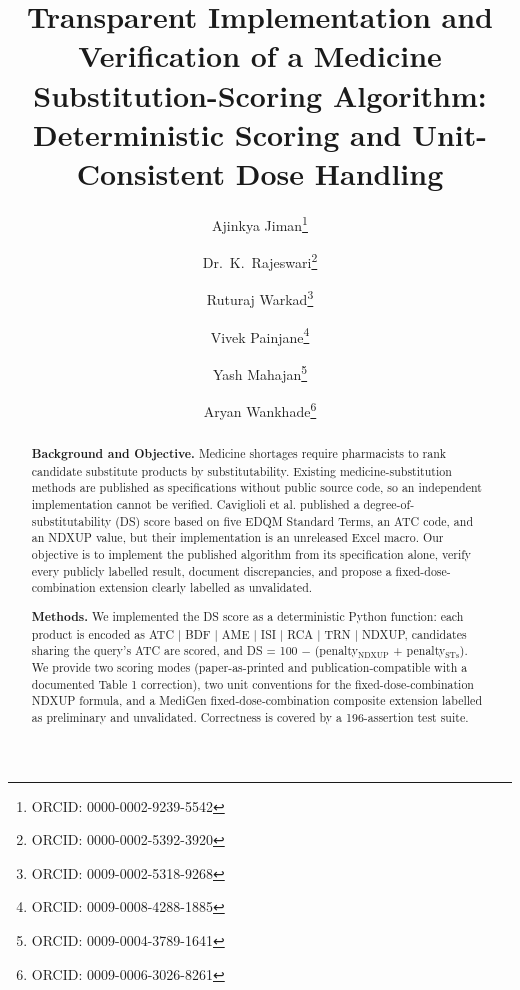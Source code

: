 \documentclass[a4paper]{elsarticle}
\begin{document}
\onecolumn

{
\setlength{\parskip}{1pt}
\setlength{\parindent}{0pt}
\begin{frontmatter}

\title{Transparent Implementation and Verification of a Medicine Substitution-Scoring Algorithm:\\Deterministic Scoring and Unit-Consistent Dose Handling}

\author[1]{Ajinkya Jiman\footnote{ORCID: 0000-0002-9239-5542}}
\author[1]{Dr.~K.~Rajeswari\footnote{ORCID: 0000-0002-5392-3920}}
\author[1]{Ruturaj Warkad\footnote{ORCID: 0009-0002-5318-9268}}
\author[1]{Vivek Painjane\footnote{ORCID: 0009-0008-4288-1885}}
\author[1]{Yash Mahajan\footnote{ORCID: 0009-0004-3789-1641}}
\author[1]{Aryan Wankhade\footnote{ORCID: 0009-0006-3026-8261}}



\begin{abstract}
\textbf{Background and Objective.} Medicine shortages require pharmacists to rank candidate substitute products by substitutability. Existing medicine-substitution methods are published as specifications without public source code, so an independent implementation cannot be verified. Caviglioli et al. published a degree-of-substitutability (DS) score based on five EDQM Standard Terms, an ATC code, and an NDXUP value, but their implementation is an unreleased Excel macro. Our objective is to implement the published algorithm from its specification alone, verify every publicly labelled result, document discrepancies, and propose a fixed-dose-combination extension clearly labelled as unvalidated.

\textbf{Methods.} We implemented the DS score as a deterministic Python function: each product is encoded as ATC | BDF | AME | ISI | RCA | TRN | NDXUP, candidates sharing the query's ATC are scored, and DS = 100 − (penalty$_\text{NDXUP}$ + penalty$_\text{STs}$). We provide two scoring modes (paper-as-printed and publication-compatible with a documented Table 1 correction), two unit conventions for the fixed-dose-combination NDXUP formula, and a MediGen fixed-dose-combination composite extension labelled as preliminary and unvalidated. Correctness is covered by a 196-assertion test suite.


\end{abstract}
\end{frontmatter}}
\end{document}
